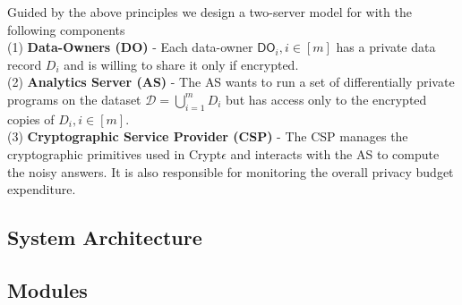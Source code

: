 {Guided by the above principles we design a two-server model for \system with the following components
\\(1)\textbf{ Data-Owners (\textsf{DO})} -  Each data-owner $\textsf{DO}_i, i \in [m]$ has  a
private data record $D_i$ and is willing to share it only if encrypted.   \\(2)\textbf{ Analytics Server (\textsf{AS})} - The \textsf{AS} wants to run a set of differentially private programs on the dataset $\mathcal{D}=\bigcup_{i=1}^m D_i$  but has 
access only to the encrypted copies of $D_i, i \in [m]$.
\\(3)\textbf{ Cryptographic Service Provider (\textsf{CSP})} -
 The \textsf{CSP} manages the cryptographic primitives used in Crypt$\epsilon$ and interacts with the \textsf{AS} to compute the
noisy answers. It is also responsible for monitoring the overall privacy budget expenditure.
}

\subsection{System Architecture}\label{sec:arch}

 
 
\subsection{\system Modules}\label{sec:modules}

